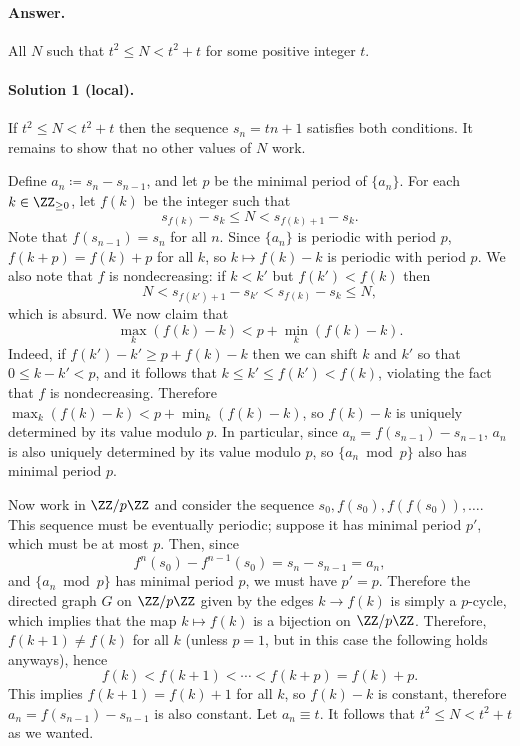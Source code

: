 \documentclass[11pt]{scrartcl}
\begin{document}
\paragraph{Answer.}
All $N$ such that $t^2 \le N < t^2+t$ for some positive integer $t$.

\paragraph{Solution 1 (local).}
If $t^2\le N < t^2+t$ then the sequence $s_n = tn+1$
satisfies both conditions.
It remains to show that no other values of $N$ work.

Define $a_n \coloneqq s_n - s_{n-1}$,
and let $p$ be the minimal period of $\{a_n\}$.
For each $k \in \ZZ_{\ge0}$,
let $f(k)$ be the integer such that
\[ s_{f(k)} - s_k \le N < s_{f(k)+1} - s_k. \]
Note that $f(s_{n-1}) = s_{n}$ for all $n$.
Since $\{a_n\}$ is periodic with period $p$, $f(k+p) = f(k) + p$ for all $k$,
so $k\mapsto f(k)-k$ is periodic with period $p$.
We also note that $f$ is nondecreasing:
if $k < k'$ but $f(k') < f(k)$ then
\[ N < s_{f(k')+1} - s_{k'} < s_{f(k)} - s_k \le N, \]
which is absurd.
We now claim that
\[ \max_{k} (f(k)-k) < p + \min_{k} (f(k)-k). \]
Indeed, if $f(k') - k' \ge p + f(k) - k$
then we can shift $k$ and $k'$ so that $0 \le k-k' < p$,
and it follows that $k \le k' \le f(k') < f(k)$,
violating the fact that $f$ is nondecreasing.
Therefore $\max_{k} (f(k)-k) < p + \min_{k} (f(k)-k)$,
so $f(k)-k$ is uniquely determined by its value modulo $p$.
In particular, since $a_n = f(s_{n-1}) - s_{n-1}$,
$a_n$ is also uniquely determined by its value modulo $p$,
so $\{a_n\bmod p\}$ also has minimal period $p$.

Now work in $\ZZ/p\ZZ$ and consider the sequence
$s_0, f(s_0), f(f(s_0)), \dots$.
This sequence must be eventually periodic;
suppose it has minimal period $p'$, which must be at most $p$.
Then, since
\[ f^{n}(s_0) - f^{n-1}(s_0) = s_{n} - s_{n-1} = a_n, \]
and $\{a_n\bmod p\}$ has minimal period $p$, we must have $p' = p$.
Therefore the directed graph $G$ on $\ZZ/p\ZZ$
given by the edges $k\to f(k)$ is simply a $p$-cycle,
which implies that the map $k\mapsto f(k)$ is a bijection on $\ZZ/p\ZZ$.
Therefore, $f(k+1)\neq f(k)$ for all $k$
(unless $p=1$, but in this case the following holds anyways), hence
\[ f(k) < f(k+1) < \dotsb < f(k+p) = f(k) + p. \]
This implies $f(k+1) = f(k)+1$ for all $k$, so $f(k)-k$ is constant,
therefore $a_n = f(s_{n-1})-s_{n-1}$ is also constant.
Let $a_n\equiv t$. It follows that $t^2\le N < t^2+t$ as we wanted.
\end{document}

